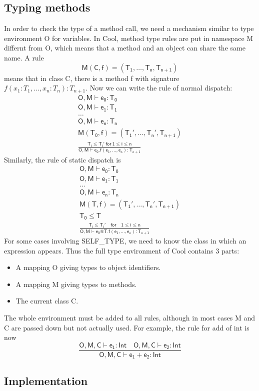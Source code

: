 \subsection{Typing methods}
In order to check the type of a method call, we need a mechanism similar to type environment O for variables. In Cool, method type rules are put in namespace M differnt from O, which means that a method and an object can share the same name. A rule 
\begin{equation*}
\mathsf{M(C,f) = (T_1,\dots,T_n,T_{n+1})}
\end{equation*}
means that in class C, there is a method f with signature $f(x_1:T_1,\dots,x_n:T_n):T_{n+1}$. Now we can write the rule of normal dispatch:
\begin{gather*}
\mathsf{O,M\vdash e_0:T_0}\\
\mathsf{O,M\vdash e_1:T_1}\\
\dots\\
\mathsf{O,M\vdash e_n:T_n}\\
\mathsf{M(T_0,f) = (T_1',\dots,T_n', T_{n+1})}\\
\mathsf{\frac{T_i\leq T_i'\:for\:1\leq i \leq n}{O,M\vdash e_0.f(e_1,\dots,e_n):T_{n+1}}}
\end{gather*}
Similarly, the rule of static dispatch is 
\begin{gather*}
\mathsf{O,M\vdash e_0:T_0}\\
\mathsf{O,M\vdash e_1:T_1}\\
\dots\\
\mathsf{O,M\vdash e_n:T_n}\\
\mathsf{M(T,f) = (T_1',\dots,T_n',T_{n+1})}\\
\mathsf{T_0\leq T}\\
\mathsf{\frac{T_i\leq T_i'\quad for\quad1\leq i \leq n}{O,M\vdash e_0@T.f(e_1,\dots,e_n): T_{n+1}}}
\end{gather*}
For some cases involving \textsf{SELF\_TYPE}, we need to know the class in which an expression appears. Thus the full type environment of Cool contains 3 parts:
\begin{itemize}
\item A mapping O giving types to object identifiers.
\item A mapping M giving types to methods.
\item The current class C.
\end{itemize}
The whole environment must be added to all rules, although in most cases M and C are passed down but not actually used. For example, the rule for add of int is now
\begin{equation*}
\mathsf{\frac{O,M,C\vdash e_1:Int\quad O,M,C\vdash e_2:Int}{O,M,C\vdash e_1+e_2:Int}}
\end{equation*}
\subsection{Implementation}
\ifx\PREAMBLE\undefined

\fi